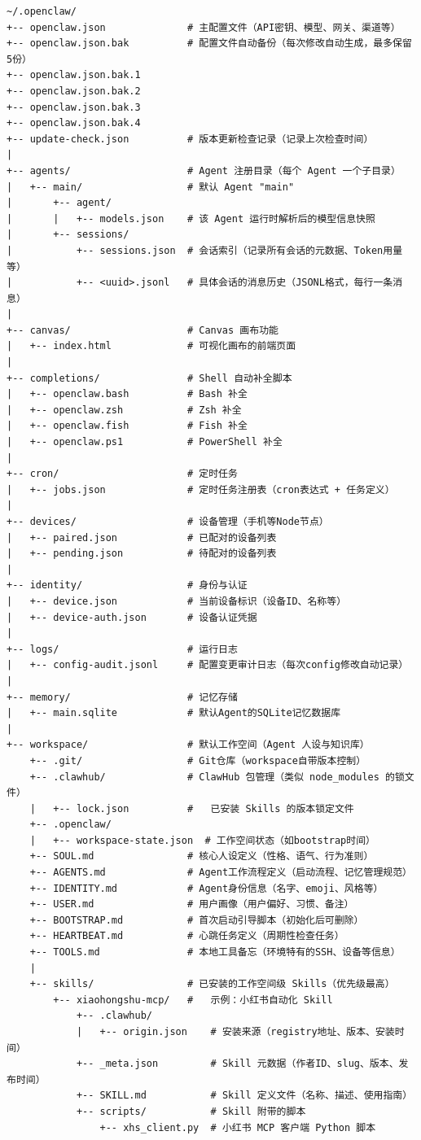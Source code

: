 \begin{lstlisting}
~/.openclaw/
+-- openclaw.json              # 主配置文件（API密钥、模型、网关、渠道等）
+-- openclaw.json.bak          # 配置文件自动备份（每次修改自动生成，最多保留5份）
+-- openclaw.json.bak.1
+-- openclaw.json.bak.2
+-- openclaw.json.bak.3
+-- openclaw.json.bak.4
+-- update-check.json          # 版本更新检查记录（记录上次检查时间）
|
+-- agents/                    # Agent 注册目录（每个 Agent 一个子目录）
|   +-- main/                  # 默认 Agent "main"
|       +-- agent/
|       |   +-- models.json    # 该 Agent 运行时解析后的模型信息快照
|       +-- sessions/
|           +-- sessions.json  # 会话索引（记录所有会话的元数据、Token用量等）
|           +-- <uuid>.jsonl   # 具体会话的消息历史（JSONL格式，每行一条消息）
|
+-- canvas/                    # Canvas 画布功能
|   +-- index.html             # 可视化画布的前端页面
|
+-- completions/               # Shell 自动补全脚本
|   +-- openclaw.bash          # Bash 补全
|   +-- openclaw.zsh           # Zsh 补全
|   +-- openclaw.fish          # Fish 补全
|   +-- openclaw.ps1           # PowerShell 补全
|
+-- cron/                      # 定时任务
|   +-- jobs.json              # 定时任务注册表（cron表达式 + 任务定义）
|
+-- devices/                   # 设备管理（手机等Node节点）
|   +-- paired.json            # 已配对的设备列表
|   +-- pending.json           # 待配对的设备列表
|
+-- identity/                  # 身份与认证
|   +-- device.json            # 当前设备标识（设备ID、名称等）
|   +-- device-auth.json       # 设备认证凭据
|
+-- logs/                      # 运行日志
|   +-- config-audit.jsonl     # 配置变更审计日志（每次config修改自动记录）
|
+-- memory/                    # 记忆存储
|   +-- main.sqlite            # 默认Agent的SQLite记忆数据库
|
+-- workspace/                 # 默认工作空间（Agent 人设与知识库）
    +-- .git/                  # Git仓库（workspace自带版本控制）
    +-- .clawhub/              # ClawHub 包管理（类似 node_modules 的锁文件）
    |   +-- lock.json          #   已安装 Skills 的版本锁定文件
    +-- .openclaw/
    |   +-- workspace-state.json  # 工作空间状态（如bootstrap时间）
    +-- SOUL.md                # 核心人设定义（性格、语气、行为准则）
    +-- AGENTS.md              # Agent工作流程定义（启动流程、记忆管理规范）
    +-- IDENTITY.md            # Agent身份信息（名字、emoji、风格等）
    +-- USER.md                # 用户画像（用户偏好、习惯、备注）
    +-- BOOTSTRAP.md           # 首次启动引导脚本（初始化后可删除）
    +-- HEARTBEAT.md           # 心跳任务定义（周期性检查任务）
    +-- TOOLS.md               # 本地工具备忘（环境特有的SSH、设备等信息）
    |
    +-- skills/                # 已安装的工作空间级 Skills（优先级最高）
        +-- xiaohongshu-mcp/   #   示例：小红书自动化 Skill
            +-- .clawhub/
            |   +-- origin.json    # 安装来源（registry地址、版本、安装时间）
            +-- _meta.json         # Skill 元数据（作者ID、slug、版本、发布时间）
            +-- SKILL.md           # Skill 定义文件（名称、描述、使用指南）
            +-- scripts/           # Skill 附带的脚本
                +-- xhs_client.py  # 小红书 MCP 客户端 Python 脚本
\end{lstlisting}

